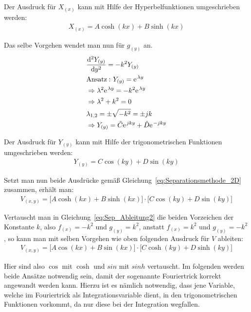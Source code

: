 Der Ausdruck für $X_{(x)}$ kann mit Hilfe der Hyperbelfunktionen umgeschrieben werden:
\begin{align}
	 X_{(x)} = A\cosh(kx) + B\sinh(kx)
\end{align}

Das selbe Vorgehen wendet man nun für $g_{(y)}$ an. 
\begin{align}
	&\dfrac{\mathrm{d}^2 Y_{(y)}}{\mathrm{d}y^2} = -k^2 Y_{(y)} \\
	&\mathrm{Ansatz:}~Y_{(y)} = \e^{\lambda y}  \notag \\
	&\Rightarrow \lambda^2 \e^{\lambda y} = -k^2 \e^{\lambda y}  \notag \\
	&\Rightarrow \lambda^2 + k^2 = 0  \notag \\
	&\lambda_{1,2} = \pm \sqrt{-k^2} = \pm jk  \notag  \\
	&\Rightarrow Y_{(y)} = \tilde{C} \e^{jky} + \tilde{D} \e^{-jky}
\end{align}

Der Ausdruck für $Y_{(y)}$ kann mit Hilfe der trigonometrischen Funktionen umgeschrieben werden:
\begin{align}
	 Y_{(y)} = C\cos(ky) + D\sin(ky)
\end{align}

Setzt man nun beide Ausdrücke gemäß Gleichung~\ref{eq:Separationsmethode_2D} zusammen, erhält man:
\begin{align}
	\label{eq:Sep_V1}	
	V_{(x,y)} = \bigl[A\cosh(kx) + B\sinh(kx)\bigr] \cdot \bigl[C\cos(ky) + D\sin(ky)\bigr]
\end{align}

Vertauscht man in Gleichung~\ref{eq:Sep_Ableitung2} die beiden Vorzeichen der Konstante $k$, also $f_{(x)} = -k^2$ und $g_{(y)} = k^2$, anstatt $f_{(x)} = k^2$ und $g_{(y)} = -k^2$, so kann man mit selben Vorgehen wie oben folgenden Ausdruck für $V$ ableiten:
\begin{align}
	\label{eq:Sep_V2}	
	V_{(x,y)} = \bigl[A\cos(kx) + B\sin(kx)\bigr] \cdot \bigl[C\cosh(ky) + D\sinh(ky)\bigr]
\end{align}

Hier sind also $\cos$ mit $\cosh$ und $sin$ mit $sinh$ vertauscht. Im folgenden werden beide Ansätze notwendig sein, damit der sogenannte \glqq Fouriertrick\grqq{} korrekt angewandt werden kann. Hierzu ist es nämlich notwendig, dass jene Variable, welche im \glqq Fouriertrick\grqq{} als Integrationsvariable dient, in den trigonometrischen Funktionen vorkommt, da nur diese bei der Integration wegfallen. 


